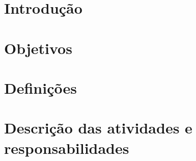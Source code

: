 \chapter{Introdução}


\chapter{Objetivos}


\chapter{Definições}


\chapter{Descrição das atividades e responsabilidades}

